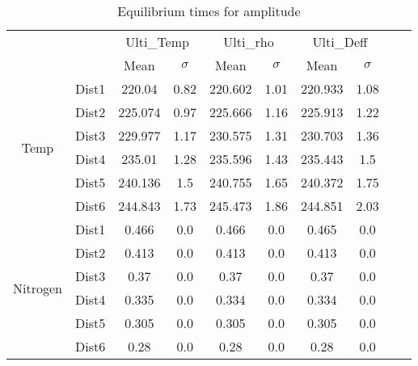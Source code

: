 \begin{table}[h]
\centering
\caption{Equilibrium times for amplitude}
\label{table:5}
\begin{tabular}{cccccccccc}
\toprule
 &  & \multicolumn{2}{c}{Ulti_Temp} & \multicolumn{2}{c}{Ulti_rho} & \multicolumn{2}{c}{Ulti_Deff} \\
 &  & Mean & $\sigma$ & Mean & $\sigma$ & Mean & $\sigma$ \\
\midrule
\multirow[c]{6}{*}{Temp} & Dist1 & 220.04 & 0.82 & 220.602 & 1.01 & 220.933 & 1.08 \\
 & Dist2 & 225.074 & 0.97 & 225.666 & 1.16 & 225.913 & 1.22 \\
 & Dist3 & 229.977 & 1.17 & 230.575 & 1.31 & 230.703 & 1.36 \\
 & Dist4 & 235.01 & 1.28 & 235.596 & 1.43 & 235.443 & 1.5 \\
 & Dist5 & 240.136 & 1.5 & 240.755 & 1.65 & 240.372 & 1.75 \\
 & Dist6 & 244.843 & 1.73 & 245.473 & 1.86 & 244.851 & 2.03 \\
\multirow[c]{6}{*}{Nitrogen} & Dist1 & 0.466 & 0.0 & 0.466 & 0.0 & 0.465 & 0.0 \\
 & Dist2 & 0.413 & 0.0 & 0.413 & 0.0 & 0.413 & 0.0 \\
 & Dist3 & 0.37 & 0.0 & 0.37 & 0.0 & 0.37 & 0.0 \\
 & Dist4 & 0.335 & 0.0 & 0.334 & 0.0 & 0.334 & 0.0 \\
 & Dist5 & 0.305 & 0.0 & 0.305 & 0.0 & 0.305 & 0.0 \\
 & Dist6 & 0.28 & 0.0 & 0.28 & 0.0 & 0.28 & 0.0 \\
\bottomrule
\end{tabular}
\end{table}
